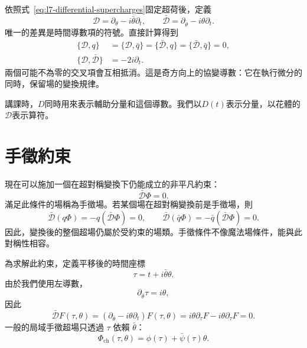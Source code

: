 依照式~\eqref{eq:l7-differential-supercharges}固定超荷後，定義
\begin{equation}
\mathcal D=\partial_\theta-i\bar\theta\partial_t,
\qquad
\bar{\mathcal D}=\partial_{\bar\theta}-i\theta\partial_t.
\label{eq:l7-covariant-derivatives}
\end{equation}
唯一的差異是時間導數項的符號。直接計算得到
\begin{align}
\{\mathcal D,q\}
&=\{\mathcal D,\bar q\}
=\{\bar{\mathcal D},q\}
=\{\bar{\mathcal D},\bar q\}=0,\\
\{\mathcal D,\bar{\mathcal D}\}&=-2i\partial_t.
\label{eq:l7-covariant-algebra}
\end{align}
兩個可能不為零的交叉項會互相抵消。這是奇方向上的協變導數：它在執行微分的同時，保留場的變換規律。

講課時，\(D\)同時用來表示輔助分量和這個導數。我們以\(D(t)\)表示分量，以花體的\(\mathcal D\)表示算符。

\section{手徵約束}

現在可以施加一個在超對稱變換下仍能成立的非平凡約束：
\begin{equation}
\bar{\mathcal D}\Phi=0.
\label{eq:l7-chiral-constraint}
\end{equation}
滿足此條件的場稱為手徵場。若某個場在超對稱變換前是手徵場，則
\begin{equation}
\bar{\mathcal D}(q\Phi)
=-q(\bar{\mathcal D}\Phi)=0,
\qquad
\bar{\mathcal D}(\bar q\Phi)
=-\bar q(\bar{\mathcal D}\Phi)=0.
\end{equation}
因此，變換後的整個超場仍屬於受約束的場類。手徵條件不像魔法場條件，能與此對稱性相容。

為求解此約束，定義平移後的時間座標
\begin{equation}
\tau=t+i\bar\theta\theta.
\label{eq:l7-chiral-time}
\end{equation}
由於我們使用左導數，
\begin{equation}
\partial_{\bar\theta}\tau=i\theta,
\end{equation}
因此
\begin{equation}
\bar{\mathcal D}F(\tau,\theta)
=\left(\partial_{\bar\theta}-i\theta\partial_t\right)F(\tau,\theta)
=i\theta\partial_\tau F-i\theta\partial_\tau F=0.
\end{equation}
一般的局域手徵超場只透過 \(\tau\) 依賴 \(\bar\theta\)：
\begin{equation}
\Phi_{\mathrm{ch}}(\tau,\theta)
=\phi(\tau)+\bar\psi(\tau)\theta.
\label{eq:l7-chiral-field-tau}
\end{equation}


